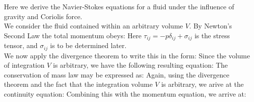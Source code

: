 Here we derive the Navier-Stokes equations for a fluid under the influence of gravity and Coriolis force.\\
\linebreak
We consider the fluid contained within an arbitrary volume $V$. By Newton's Second Law the total momentum obeys:
Here $\tau_{ij} = -p\delta_{ij} + \sigma_{ij}$ is the stress tensor, and $\sigma_{ij}$ is to be determined later.\\
We now apply the divergence theorem to write this in the form:
Since the volume of integration $V$ is arbitrary, we have the following resulting equation:
The conservation of mass law may be expressed as:
Again, using the divergence theorem and the fact that the integration volume $V$ is arbitrary, we arive at the continuity equation:
Combining this with the momentum equation, we arrive at:

